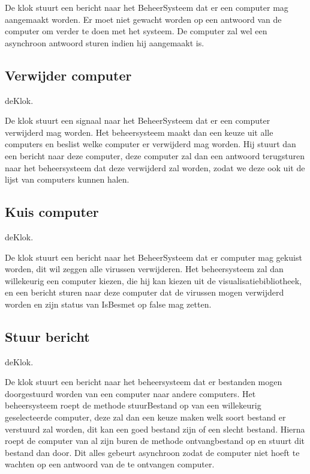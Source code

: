 \documentclass[a4paper,oneside]{report}
\begin{document}
De klok stuurt een bericht naar het BeheerSysteem dat er een computer mag aangemaakt worden. Er moet niet gewacht worden op een antwoord van de computer om verder te doen met het systeem. De computer zal wel een asynchroon antwoord sturen indien hij aangemaakt is.


\newpage
\subsection{Verwijder computer}
deKlok.

De klok stuurt een signaal naar het BeheerSysteem dat er een computer verwijderd mag worden. Het beheersysteem maakt dan een keuze uit alle computers en beslist welke computer er verwijderd mag worden. Hij stuurt dan een bericht naar deze computer, deze computer zal dan een antwoord terugsturen naar het beheersysteem dat deze verwijderd zal worden, zodat we deze ook uit de lijst van computers kunnen halen.


\newpage
\subsection{Kuis computer}
deKlok.

De klok stuurt een bericht naar het BeheerSysteem dat er computer mag gekuist worden, dit wil zeggen alle virussen verwijderen. Het beheersysteem zal dan willekeurig een computer kiezen, die hij kan kiezen uit de visualisatiebibliotheek, en een bericht sturen naar deze computer dat de virussen mogen verwijderd worden en zijn status van IsBesmet op false mag zetten.


\newpage
\subsection{Stuur bericht}
deKlok.

De klok stuurt een bericht naar het beheersysteem dat er bestanden mogen doorgestuurd worden van een computer naar andere computers. Het beheersysteem roept de methode stuurBestand op van een willekeurig geselecteerde computer, deze zal dan een keuze maken welk soort bestand er verstuurd zal worden, dit kan een goed bestand zijn of een slecht bestand. Hierna roept de computer van al zijn buren de methode ontvangbestand op en stuurt dit bestand dan door. Dit alles gebeurt asynchroon zodat de computer niet hoeft te wachten op een antwoord van de te ontvangen computer.
\end{document}
